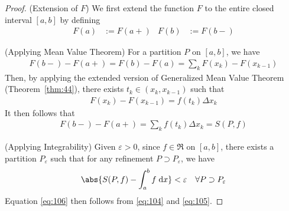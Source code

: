 \documentclass[thmcnt=section, 12pt]{elegantbook}
\begin{document}
\begin{proof}
    (Extension of $F$) We first extend the function $F$ to the entire closed interval $[a, b]$ by defining
    \begin{align*}
        F(a) &:= F(a+) &
        F(b) &:= F(b-)
    \end{align*}
    
    \par (Applying Mean Value Theorem) For a partition $P$ on $[a, b]$, we have 
    \begin{align*}
        F(b-) - F(a+) = F(b) - F(a) = \sum_k F(x_k) - F(x_{k-1})
    \end{align*}
    Then, by applying the extended version of Generalized Mean Value Theorem (Theorem~\ref{thm:44}), there exists $t_k \in (x_k, x_{k-1})$ such that 
    \begin{align*}
        F(x_k) - F(x_{k-1}) = f(t_k) \Delta x_k
    \end{align*}
    It then follows that 
    \begin{align}
        F(b-) - F(a+) = \sum_k f(t_k) \Delta x_k
        = S(P, f)
        \label{eq:104}
    \end{align}

    \par (Applying Integrability) Given $\varepsilon > 0$, since $f \in \mathfrak{R}$ on $[a, b]$, there exists a partition $P_\varepsilon$ such that for any refinement $P \supset P_\varepsilon$, we have 
    \begin{align}
        \abs{S(P, f) - \int_a^b f \; \mathrm{d}x} < \varepsilon
        \quad \forall P \supset P_\varepsilon
        \label{eq:105}
    \end{align}
    Equation \eqref{eq:106} then follows from \eqref{eq:104} and \eqref{eq:105}.
\end{proof}
\end{document}
